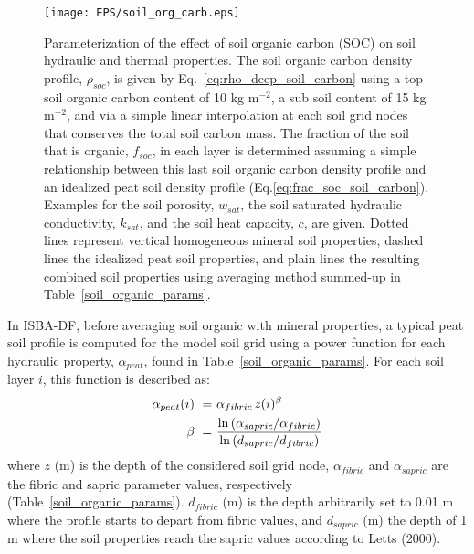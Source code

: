 \begin{figure}[!b]
\centerline{
\texttt{[image: EPS/soil\_org\_carb.eps]}}
\caption{Parameterization of the effect of soil organic carbon (SOC) on soil
hydraulic and thermal properties. The soil organic carbon density
profile, $\rho_{soc}$, is given by 
Eq.~\ref{eq:rho_deep_soil_carbon} 
using a top soil organic
carbon content of 10 kg m$^{-2}$, a sub soil content 
of 15 kg m$^{-2}$, and via
a simple linear interpolation at each soil grid nodes that conserves
the total soil carbon mass. The fraction of the soil that is organic,
$f_{soc}$, in each layer is determined assuming a simple relationship
between this last soil organic carbon density profile and an idealized
peat soil density profile 
(Eq.\ref{eq:frac_soc_soil_carbon}). 
Examples for the soil
porosity, $w_{sat}$, the soil saturated hydraulic conductivity, $k_{sat}$, and
the soil heat capacity, $c$, are given. Dotted lines represent vertical
homogeneous mineral soil properties, dashed lines the idealized peat
soil properties, and plain lines the resulting combined soil
properties using averaging method summed-up in Table~\ref{soil_organic_params}.}
\label{fig:soil_organic_carbon_profiles}
\end{figure}



In ISBA-DF, before averaging soil organic with mineral properties, a
typical peat soil profile is computed for the model soil grid using a
power function for each hydraulic property, $\alpha_{peat}$, found in 
Table~\ref{soil_organic_params}. 
For each soil layer $i$, this function is described as:
%
\begin{align}
\label{eq:alpha_peat_soil_carbon}
%
\alpha_{peat}(i) \,\,=&\,\, \alpha_{fibric} \, z(i)^\beta  
\\
\beta \,\,=&\,\,
\frac
{{\rm ln}\left( \alpha_{sapric} / \alpha_{fibric} \right)}
{{\rm ln}\left(d_{sapric} / d_{fibric} \right)}
%
\end{align}
%
where $z$ (m) is the depth of the considered soil grid node, $\alpha_{fibric}$ and
$\alpha_{sapric}$ are the fibric and sapric parameter values,
respectively (Table~\ref{soil_organic_params}). 
$d_{fibric}$ (m) is
the depth arbitrarily set to 0.01 m where the profile starts to depart
from fibric values, and $d_{sapric}$ (m) the depth of 1 m where the soil
properties reach the sapric values according to Letts \etal (2000)\nocite{Letts_ea_2000}.

